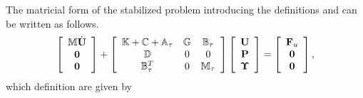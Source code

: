 The matricial form of the stabilized problem  introducing the definitions  and  can be written as follows. 
\begin{equation}
\label{eq-C7_NSmatform}
\left[\begin{array}{c}
\mathbb{M}\dot{{\bf U}}\\
\mathbf{0}\\
\mathbf{0}
\end{array}\right]+\left[\begin{array}{ccc}
\mathbb{K}+\mathbb{C}+\mathbb{A}_\tau&\mathbb{G}&\mathbb{B}_\tau\\
\mathbb{D}&0&0\\
\mathbb{B}_\tau^T&0&\mathbb{M}_\tau
\end{array}\right]\left[\begin{array}{c}
{\bf U}\\
{\bf P}\\
\boldsymbol{\Upsilon}
\end{array}\right]=\left[\begin{array}{c}
{\bf F}_u\\
\mathbf{0}\\
\mathbf{0}
\end{array}\right],
\end{equation}
which definition are given by
